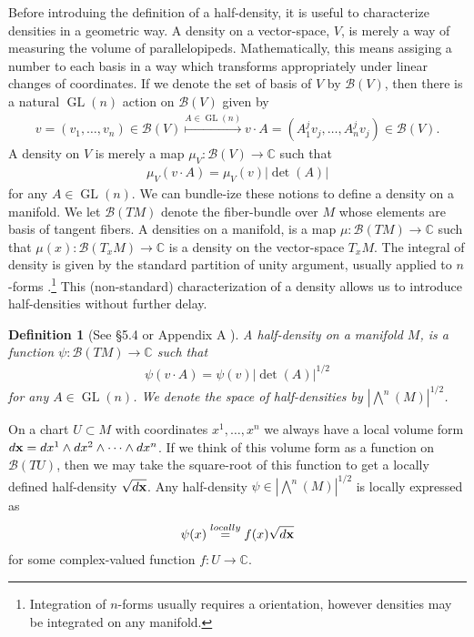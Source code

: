 \documentclass[12pt]{amsart}
\newtheorem{defn}{Definition}
\DeclareMathOperator{\GL}{GL}
\begin{document}
Before introduing the definition of a half-density, it is useful
to characterize densities in a geometric way.
A density on a vector-space, $V$, is merely a way of measuring the volume
of parallelopipeds.
Mathematically, this means assiging a number to each basis in a way which transforms appropriately under linear changes of coordinates.
If we denote the set of basis of $V$ by $\mathcal{B}(V)$,
 then there is a natural $\GL(n)$ action on $\mathcal{B}(V)$ given by
 \begin{align*}
  v = (v_1,\dots,v_n) \in \mathcal{B}(V) \stackrel{A \in \GL(n)}{\mapsto} v \cdot A = (A_1^j v_j, \dots, A_n^j v_j) \in \mathcal{B}(V).
 \end{align*}
A density on $V$ is merely a map $\mu_V: \mathcal{B}(V) \to \mathbb{C}$ such that
\begin{align*}
  \mu_V( v \cdot A) = \mu_V(v) | \det(A) |
\end{align*}
for any $A \in \GL(n)$.
We can bundle-ize these notions to define a density on a manifold.
We let $\mathcal{B}(TM)$ denote the fiber-bundle over $M$ whose elements are basis of tangent fibers.
A densities on a manifold, is a map $\mu:\mathcal{B}(TM) \to \mathbb{C}$ such that $\mu(x): \mathcal{B}(T_xM) \to \mathbb{C}$ is a density on the vector-space $T_xM$.
 The integral of density is given by the standard partition of unity argument, usually applied to $n$-forms \cite[Chapter 14]{Lee2006}.\footnote{Integration of $n$-forms usually requires a orientation, however densities may be integrated on any manifold.}
This (non-standard) characterization of a density allows us to introduce half-densities without further delay.

\begin{defn}
  [See \S 5.4 \cite{GuilleminSternberg1970} or Appendix A \cite{BatesWeinstein1997}]
  A half-density on a manifold $M$, is a function $\psi : \mathcal{B}(TM) \to \mathbb{C}$ such that
  \begin{align*}
    \psi( v \cdot A) = \psi( v ) | \det(A) |^{1/2}
  \end{align*}
  for any $A \in \GL(n)$.
  We denote the space of half-densities by $|\bigwedge^n(M)|^{1/2}$.
\end{defn}

On a chart $U \subset M$ with coordinates $x^1,\dots,x^n$ we always have a local volume form $d{\bf x} = dx^1\wedge dx^2 \wedge \cdots \wedge dx^n$.
If we think of this volume form as a function on $\mathcal{B}(TU)$, then we may take the square-root of this function to get a locally defined half-density $\sqrt{d{\bf x}}$.
Any half-density $\psi \in | \bigwedge^n(M)|^{1/2}$ is locally expressed as
\begin{align*}
  \psi(x) \stackrel{locally}{=} f(x) \sqrt{d {\bf x}}
\end{align*}
for some complex-valued function $f:U \to \mathbb{C}$.
\end{document}
